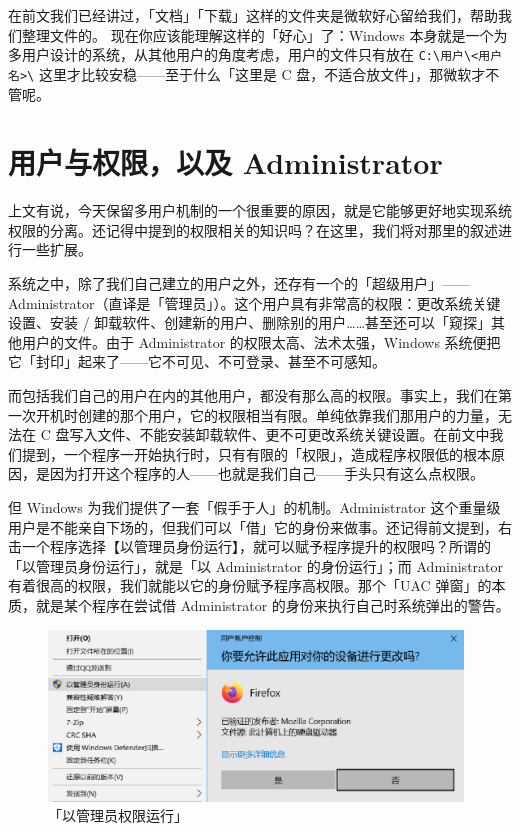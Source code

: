 在前文我们已经讲过，「文档」「下载」这样的文件夹是微软好心留给我们，帮助我们整理文件的。
现在你应该能理解这样的「好心」了：Windows 本身就是一个为多用户设计的系统，从其他用户的角度考虑，用户的文件只有放在 \verb|C:\用户\<用户名>\| 这里才比较安稳——至于什么「这里是 C 盘，不适合放文件」，那微软才不管呢。

\section{用户与权限，以及 Administrator}

上文有说，今天保留多用户机制的一个很重要的原因，就是它能够更好地实现系统权限的分离。还记得中提到的权限相关的知识吗？在这里，我们将对那里的叙述进行一些扩展。

系统之中，除了我们自己建立的用户之外，还存有一个的「超级用户」——Administrator（直译是「管理员」）。这个用户具有非常高的权限：更改系统关键设置、安装 / 卸载软件、创建新的用户、删除别的用户……甚至还可以「窥探」其他用户的文件。由于 Administrator 的权限太高、法术太强，Windows 系统便把它「封印」起来了——它不可见、不可登录、甚至不可感知。

而包括我们自己的用户在内的其他用户，都没有那么高的权限。事实上，我们在第一次开机时创建的那个用户，它的权限相当有限。单纯依靠我们那用户的力量，无法在 C 盘写入文件、不能安装卸载软件、更不可更改系统关键设置。在前文中我们提到，一个程序一开始执行时，只有有限的「权限」，造成程序权限低的根本原因，是因为打开这个程序的人——也就是我们自己——手头只有这么点权限。

但 Windows 为我们提供了一套「假手于人」的机制。Administrator 这个重量级用户是不能亲自下场的，但我们可以「借」它的身份来做事。还记得前文提到，右击一个程序选择【以管理员身份运行】，就可以赋予程序提升的权限吗？所谓的「以管理员身份运行」，就是「以 Administrator 的身份运行」；而 Administrator 有着很高的权限，我们就能以它的身份赋予程序高权限。那个「UAC 弹窗」的本质，就是某个程序在尝试借 Administrator 的身份来执行自己时系统弹出的警告。

\begin{figure}[htb!]
  \centering
  \includegraphics[width=11cm]{assets/Run_as_Admin.png}
  \caption{「以管理员权限运行」}
  \label{run-as-admin}
\end{figure}

